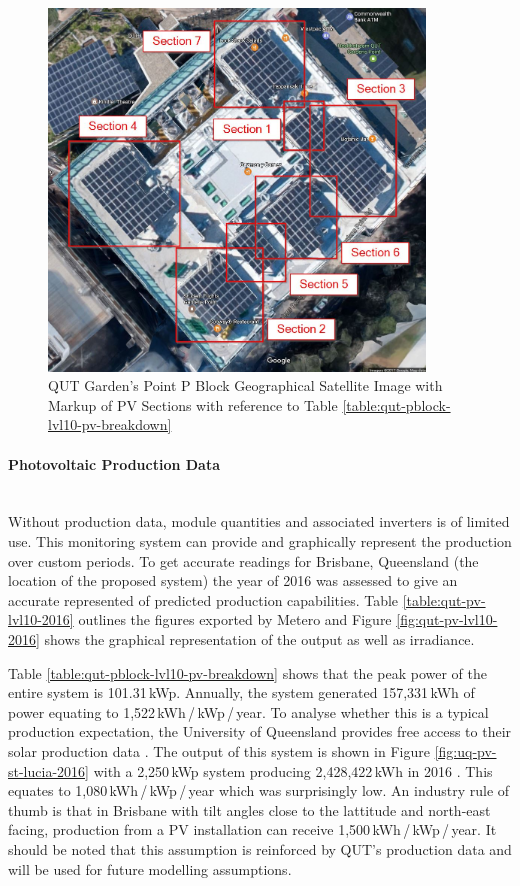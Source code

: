 \begin{figure}[H]
	\hfill\includegraphics[width=100mm]{images/qut-pblock-section-markup}\hspace*{\fill}
	\caption{QUT Garden's Point P Block Geographical Satellite Image with Markup of PV Sections with reference to Table \ref{table:qut-pblock-lvl10-pv-breakdown}} 
	\label{fig:qut-map-pv-pblock-lvl0-markup}
\end{figure}

\paragraph{Photovoltaic Production Data}
~\\
Without production data, module quantities and associated inverters is of limited use. This monitoring system can provide and graphically represent the production over custom periods. To get accurate readings for Brisbane, Queensland (the location of the proposed system) the year of 2016 was assessed to give an accurate represented of predicted production capabilities. Table \ref{table:qut-pv-lvl10-2016} outlines the figures exported by Metero and Figure \ref{fig:qut-pv-lvl10-2016} shows the graphical representation of the output as well as irradiance. 
\newline

Table \ref{table:qut-pblock-lvl10-pv-breakdown} shows that the peak power of the entire system is 101.31\,kWp. Annually, the system generated 157,331\,kWh of power equating to 1,522\,kWh\,/\,kWp\,/\,year. To analyse whether this is a typical production expectation, the University of Queensland provides free access to their solar production data \cite{website:UQData1}. The output of this system is shown in Figure \ref{fig:uq-pv-st-lucia-2016} with a 2,250\,kWp system producing 2,428,422\,kWh in 2016 \cite{website:UQData1}. This equates to 1,080\,kWh\,/\,kWp\,/\,year which was surprisingly low. An industry rule of thumb is that in Brisbane with tilt angles close to the lattitude and north-east facing, production from a PV installation can receive 1,500\,kWh\,/\,kWp\,/\,year. It should be noted that this assumption is reinforced by QUT's production data and will be used for future modelling assumptions.   

